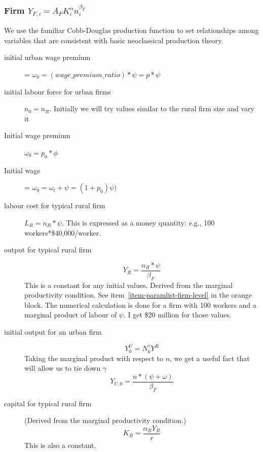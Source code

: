 \subsubsection{Firm $Y_{F,i}=A_FK_i^\alpha n_i^{\beta_F}$}
We use the familiar Cobb-Douglas production function \cite{chiangFundamentalMethodsMathematical2002} to set relationships among variables that are consistent with basic neoclassical production theory. 
\begin{description}

\item[initial urban wage premium] = $\omega_0 = (wage\_premium\_ratio) * \psi = p*\psi $

\item[initial labour force for urban firms] $n_0=n_R$.  Initially we will try values similar to the rural firm size and vary it  %

\item[Initial wage premium] $\omega_0=p_0*\phi$

\item[Initial wage] = $\omega_0=\omega_t +\psi =(1+p_0)\psi)$

\item[labour cost for typical rural firm] $L_R = n_R*\psi$. This is expressed as a money quantity: e.g., 100 workers*\$40,000/worker.  


\item[output for typical rural firm]  
\[Y_R=\frac{n_R*\psi}{\beta_F}\]
This is a constant for any initial values. Derived from the marginal productivity condition. See item~\ref{item-paramlist-firm-level} in the orange  block. The numerical calculation is done  for a firm with 100 workers and a marginal product of labour of $\psi$. I get \$20 million for those values. 


\item[initial output for an urban firm] 
\[Y_0^U=N_0^\gamma Y^R\]  
Taking the marginal product with respect to $n$, we get a useful fact that will allow us to tie down $\gamma$
\[Y_{U,0}=\frac{n*(\psi+\omega)}{\beta_F}\]

\item[capital for typical rural firm] (Derived from the marginal productivity condition.)
\[K_R=  \frac{\alpha_R Y_R }{r}\]
This is also a constant.
 

\end{description}

